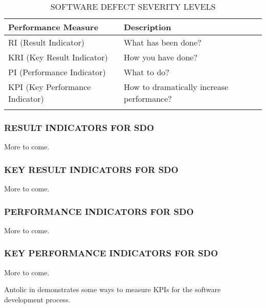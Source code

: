 \documentclass[SDSUThesis.tex]{subfiles}
\begin{document}
        \begin{longtable}{@{}l l}
                \toprule%
                 \centering%
                 {\bfseries Performance Measure}
                 & {\bfseries Description}\\
                
                \cmidrule[0.4pt](r{0.125em}){1-1}%
                \cmidrule[0.4pt](lr{0.125em}){2-2}%
                \endhead
                
                RI (Result Indicator) & What has been done?   \\
                \myrowcolour%
                KRI (Key Result Indicator) & How you have done? \\
                PI (Performance Indicator) & What to do? \\
                \myrowcolour%
                KPI (Key Performance Indicator) & How to dramatically increase performance? \\
                
                \bottomrule
                
                \caption{SOFTWARE DEFECT SEVERITY LEVELS}
                \label{tab:indicators}
            \end{longtable}
        
        \subsubsection{RESULT INDICATORS FOR SDO}
            More to come.
            
        \subsubsection{KEY RESULT INDICATORS FOR SDO}
            More to come.
        
        \subsubsection{PERFORMANCE INDICATORS FOR SDO}
            More to come.
            
        \subsubsection{KEY PERFORMANCE INDICATORS FOR SDO}
            More to come.
        
        Antolic in \cite{Antolic2008} demonstrates some ways to measure KPIs for the  software development process.
    
\end{document}
